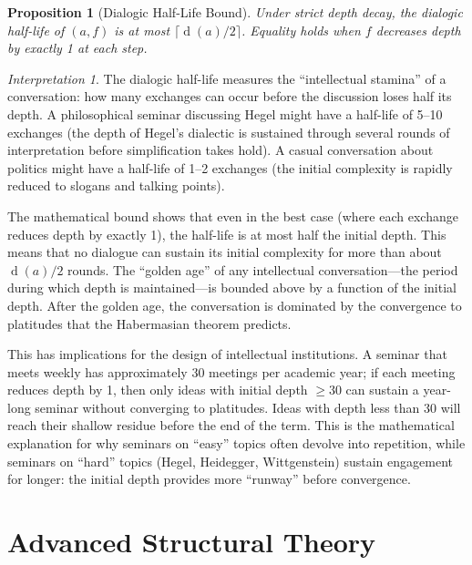 \documentclass[11pt,openany]{book}
\theoremstyle{definition}
\theoremstyle{plain}
\newtheorem{proposition}[axiom]{Proposition}
\theoremstyle{remark}
\newtheorem{interpretation}[axiom]{Interpretation}
\newcommand{\depth}{\operatorname{d}}       %
\begin{document}
\begin{proposition}[Dialogic Half-Life Bound]
Under strict depth decay, the dialogic half-life of $(a, f)$ is at most $\lceil \depth(a)/2 \rceil$. Equality holds when $f$ decreases depth by exactly 1 at each step.
\end{proposition}

\begin{interpretation}
The dialogic half-life measures the ``intellectual stamina'' of a conversation: how many exchanges can occur before the discussion loses half its depth. A philosophical seminar discussing Hegel might have a half-life of 5--10 exchanges (the depth of Hegel's dialectic is sustained through several rounds of interpretation before simplification takes hold). A casual conversation about politics might have a half-life of 1--2 exchanges (the initial complexity is rapidly reduced to slogans and talking points).

The mathematical bound shows that even in the best case (where each exchange reduces depth by exactly 1), the half-life is at most half the initial depth. This means that no dialogue can sustain its initial complexity for more than about $\depth(a)/2$ rounds. The ``golden age'' of any intellectual conversation---the period during which depth is maintained---is bounded above by a function of the initial depth. After the golden age, the conversation is dominated by the convergence to platitudes that the Habermasian theorem predicts.

This has implications for the design of intellectual institutions. A seminar that meets weekly has approximately 30 meetings per academic year; if each meeting reduces depth by 1, then only ideas with initial depth $\geq 30$ can sustain a year-long seminar without converging to platitudes. Ideas with depth less than 30 will reach their shallow residue before the end of the term. This is the mathematical explanation for why seminars on ``easy'' topics often devolve into repetition, while seminars on ``hard'' topics (Hegel, Heidegger, Wittgenstein) sustain engagement for longer: the initial depth provides more ``runway'' before convergence.
\end{interpretation}

\part{Advanced Structural Theory}
\end{document}
